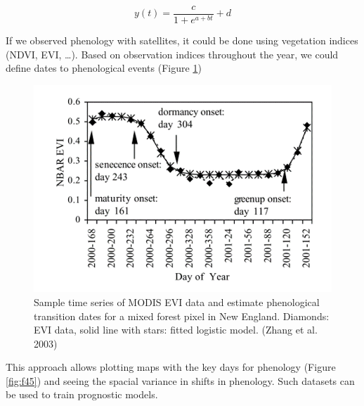 \documentclass[
  12pt,
  oneside]{book}
\begin{document}
\[
y(t)=\frac{c}{1+e^{a+bt}}+d
\]

If we observed phenology with satellites, it could be done using vegetation indices (NDVI, EVI, \ldots). Based on observation indices throughout the year, we could define dates to phenological events (Figure \ref{fig:f44})

\begin{figure}

{\centering \includegraphics[width=0.8\linewidth]{figures/chap4/f44_zhang} 

}

\caption{Sample time series of MODIS EVI data and estimate phenological transition dates for a mixed forest pixel in New England. Diamonds: EVI data, solid line with stars: fitted logistic model. (Zhang et al. 2003)}\label{fig:f44}
\end{figure}

This approach allows plotting maps with the key days for phenology (Figure \ref{fig:f45}) and seeing the spacial variance in shifts in phenology. Such datasets can be used to train prognostic models.
\end{document}
